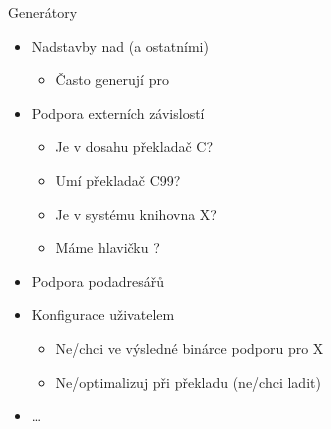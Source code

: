 \begin{frame}{Generátory}

  \begin{itemize}
    \item Nadstavby nad \make (a ostatními)
    \begin{itemize}
      \item Často generují  pro \make
    \end{itemize}

    \pause

    \item Podpora externích závislostí
    \begin{itemize}
      \item Je v dosahu překladač C?
      \item Umí překladač C99?
      \item Je v systému knihovna X?
      \item Máme hlavičku ?
    \end{itemize}

    \pause

    \item Podpora podadresářů

    \pause

    \item Konfigurace uživatelem
    \begin{itemize}
      \item Ne/chci ve výsledné binárce podporu pro X
      \item Ne/optimalizuj při překladu (ne/chci ladit)
    \end{itemize}

    \pause

    \item \dots
  \end{itemize}

\end{frame}

